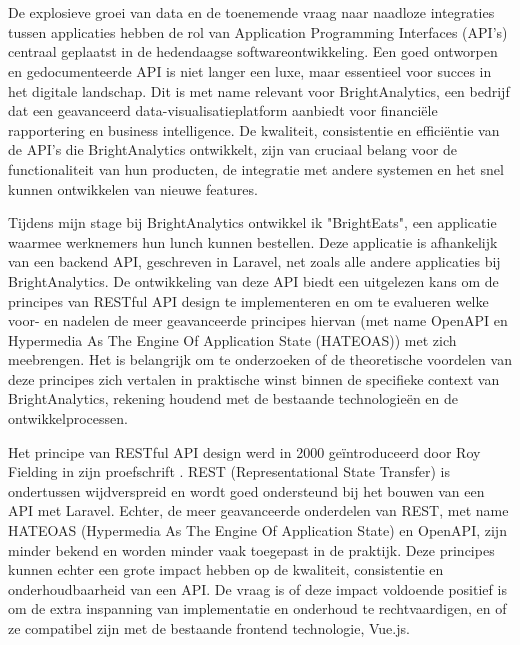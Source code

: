 
\chapter{}%
\label{ch:inleiding}

De explosieve groei van data en de toenemende vraag naar naadloze integraties tussen applicaties hebben de rol van Application Programming Interfaces (API's) centraal geplaatst in de hedendaagse softwareontwikkeling. Een goed ontworpen en gedocumenteerde API is niet langer een luxe, maar essentieel voor succes in het digitale landschap. Dit is met name relevant voor BrightAnalytics, een bedrijf dat een geavanceerd data-visualisatieplatform aanbiedt voor financiële rapportering en business intelligence. De kwaliteit, consistentie en efficiëntie van de API's die BrightAnalytics ontwikkelt, zijn van cruciaal belang voor de functionaliteit van hun producten, de integratie met andere systemen en het snel kunnen ontwikkelen van nieuwe features.

\bigskip

Tijdens mijn stage bij BrightAnalytics ontwikkel ik "BrightEats", een applicatie waarmee werknemers hun lunch kunnen bestellen. Deze applicatie is afhankelijk van een backend API, geschreven in Laravel, net zoals alle andere applicaties bij BrightAnalytics. De ontwikkeling van deze API biedt een uitgelezen kans om de principes van RESTful API design te implementeren en om te evalueren welke voor- en nadelen de meer geavanceerde principes hiervan (met name OpenAPI en Hypermedia As The Engine Of Application State (HATEOAS)) met zich meebrengen. Het is belangrijk om te onderzoeken of de theoretische voordelen van deze principes zich vertalen in praktische winst binnen de specifieke context van BrightAnalytics, rekening houdend met de bestaande technologieën en de ontwikkelprocessen.

\bigskip

Het principe van RESTful API design werd in 2000 geïntroduceerd door Roy Fielding in zijn proefschrift \autocite{Fielding2000}. REST (Representational State Transfer) is ondertussen wijdverspreid en wordt goed ondersteund bij het bouwen van een API met Laravel. Echter, de meer geavanceerde onderdelen van REST, met name HATEOAS (Hypermedia As The Engine Of Application State) en OpenAPI, zijn minder bekend en worden minder vaak toegepast in de praktijk. Deze principes kunnen echter een grote impact hebben op de kwaliteit, consistentie en onderhoudbaarheid van een API. De vraag is of deze impact voldoende positief is om de extra inspanning van implementatie en onderhoud te rechtvaardigen, en of ze compatibel zijn met de bestaande frontend technologie, Vue.js.

